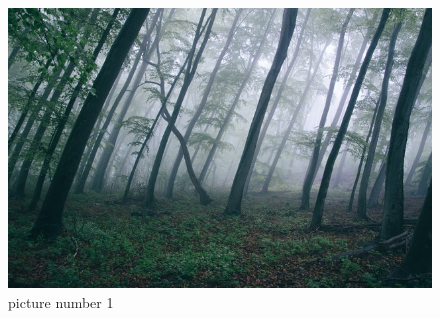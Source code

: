 \begin{frame}
    \begin{figure}[!tbp]
        \centering
        \begin{minipage}{0.4\textwidth}
            \includegraphics[width=\textwidth]{pictureSlides/test-image.jpg}
            \caption{picture number 1}
        \end{minipage}
        \hfill
        \begin{minipage}{0.5\textwidth}
            \lipsum[1][1-5]
        \end{minipage}
    \end{figure}
\end{frame}
